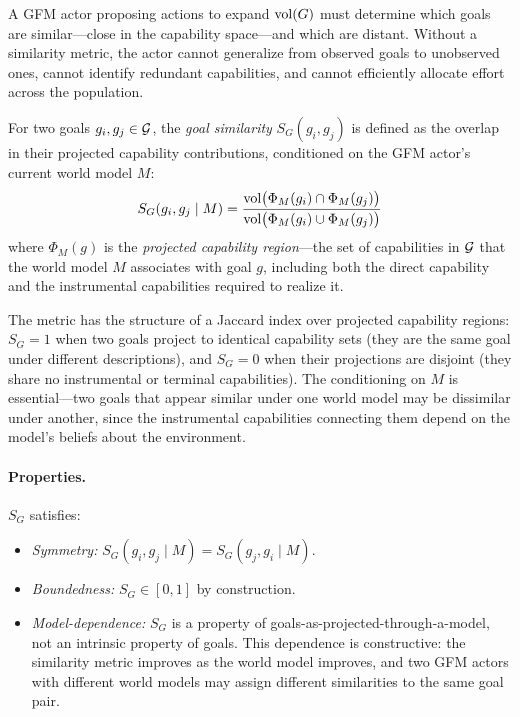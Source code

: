 A GFM actor proposing actions to expand $\operatorname{vol}(G)$ must determine which goals are similar---close in the capability space---and which are distant. Without a similarity metric, the actor cannot generalize from observed goals to unobserved ones, cannot identify redundant capabilities, and cannot efficiently allocate effort across the population.

\begin{definition}
\label{def:goal_similarity}
For two goals $g_i, g_j \in \mathcal{G}$, the \emph{goal similarity} $S_G(g_i, g_j)$ is defined as the overlap in their projected capability contributions, conditioned on the GFM actor's current world model $M$:
\begin{equation}
\label{eq:goal_similarity}
S_G(g_i, g_j \mid M) = \frac{\operatorname{vol}\bigl(\Phi_M(g_i) \cap \Phi_M(g_j)\bigr)}{\operatorname{vol}\bigl(\Phi_M(g_i) \cup \Phi_M(g_j)\bigr)}
\end{equation}
where $\Phi_M(g)$ is the \emph{projected capability region}---the set of capabilities in $\mathcal{G}$ that the world model $M$ associates with goal $g$, including both the direct capability and the instrumental capabilities required to realize it.
\end{definition}

The metric has the structure of a Jaccard index over projected capability regions: $S_G = 1$ when two goals project to identical capability sets (they are the same goal under different descriptions), and $S_G = 0$ when their projections are disjoint (they share no instrumental or terminal capabilities). The conditioning on $M$ is essential---two goals that appear similar under one world model may be dissimilar under another, since the instrumental capabilities connecting them depend on the model's beliefs about the environment.

\paragraph{Properties.} $S_G$ satisfies:
\begin{itemize}
\item \emph{Symmetry:} $S_G(g_i, g_j \mid M) = S_G(g_j, g_i \mid M)$.
\item \emph{Boundedness:} $S_G \in [0, 1]$ by construction.
\item \emph{Model-dependence:} $S_G$ is a property of goals-as-projected-through-a-model, not an intrinsic property of goals. This dependence is constructive: the similarity metric improves as the world model improves, and two GFM actors with different world models may assign different similarities to the same goal pair.
\end{itemize}

